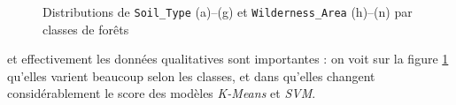 \documentclass[12pt,a4paper]{article}
\numberwithin{equation}{section}
\begin{document}
\begin{figure}[h]
		\medskip
		
		\caption{Distributions de \texttt{Soil\_Type} (a)--(g) et \texttt{Wilderness\_Area} (h)--(n) par classes de forêts}
		\label{fig:soil-wild_hist}
	\end{figure}
	
	et effectivement les données qualitatives sont importantes : on voit sur la figure \ref{fig:soil-wild_hist} qu'elles varient beaucoup selon les classes, et dans \cite{C-D} qu'elles changent considérablement le score des modèles \textit{K-Means} et \textit{SVM}.
	
	\newpage
	
	
	
	
	
\end{document}
